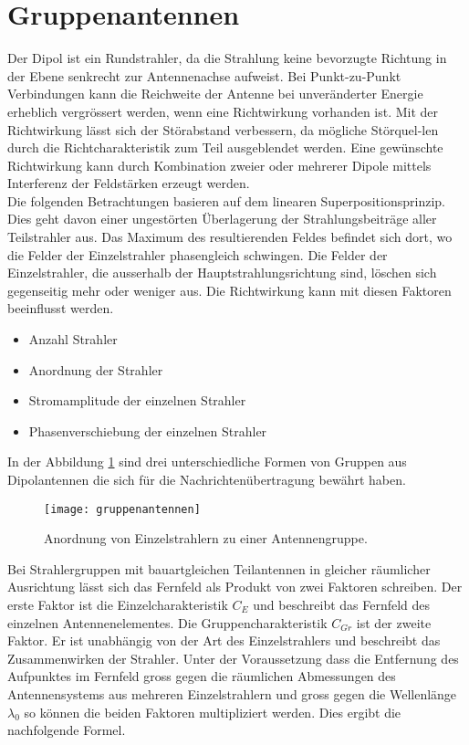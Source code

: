 \section{Gruppenantennen}\label{sec:gruppenantennen}
Der Dipol ist ein Rundstrahler, da die Strahlung keine bevorzugte Richtung in der Ebene senkrecht zur Antennenachse aufweist. Bei Punkt-zu-Punkt Verbindungen kann die Reichweite der Antenne bei unveränderter Energie erheblich vergrössert werden, wenn eine Richtwirkung vorhanden ist. Mit der Richtwirkung lässt sich der Störabstand verbessern, da mögliche Störquel-len durch die Richtcharakteristik zum Teil ausgeblendet werden. Eine gewünschte Richtwirkung kann durch Kombination zweier oder mehrerer Dipole mittels Interferenz der Feldstärken erzeugt werden.\\

Die folgenden Betrachtungen basieren auf dem linearen Superpositionsprinzip. Dies geht davon einer ungestörten Überlagerung der Strahlungsbeiträge aller Teilstrahler aus. Das Maximum des resultierenden Feldes befindet sich dort, wo die Felder der Einzelstrahler phasengleich schwingen. Die Felder der Einzelstrahler, die ausserhalb der Hauptstrahlungsrichtung sind, löschen sich gegenseitig mehr oder weniger aus. Die Richtwirkung kann mit diesen Faktoren beeinflusst werden.

\begin{itemize}
	\item Anzahl Strahler
	\item Anordnung der Strahler
	\item Stromamplitude der einzelnen Strahler
	\item Phasenverschiebung der einzelnen Strahler
\end{itemize}

In der Abbildung \ref{fig:gruppenantennen} sind drei unterschiedliche Formen von Gruppen aus Dipolantennen die sich für die Nachrichtenübertragung bewährt haben. 

\begin{figure}[H]
	\centering
	\texttt{[image: gruppenantennen]}
	\caption{Anordnung von Einzelstrahlern zu einer Antennengruppe.}\label{fig:gruppenantennen}
\end{figure}

Bei Strahlergruppen mit bauartgleichen Teilantennen in gleicher räumlicher Ausrichtung lässt sich das Fernfeld als Produkt von zwei Faktoren schreiben. Der erste Faktor ist die Einzelcharakteristik $ C_{E} $ und beschreibt das Fernfeld des einzelnen Antennenelementes. Die Gruppencharakteristik $ C_{Gr} $ ist der zweite Faktor. Er ist unabhängig von der Art des Einzelstrahlers und beschreibt das Zusammenwirken der Strahler. Unter der Voraussetzung dass die Entfernung des Aufpunktes im Fernfeld gross gegen die räumlichen Abmessungen des Antennensystems aus mehreren Einzelstrahlern und gross gegen die Wellenlänge $ \lambda_{0} $ so können die beiden Faktoren multipliziert werden. Dies ergibt die nachfolgende Formel.

